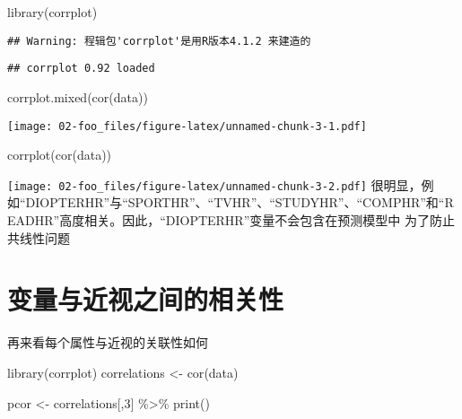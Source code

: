 \documentclass[]{ctexbook}
\newenvironment{Shaded}{\begin{snugshade}}{\end{snugshade}}
\newcommand{\DecValTok}[1]{\textcolor[rgb]{0.00,0.00,0.81}{#1}}
\newcommand{\FunctionTok}[1]{\textcolor[rgb]{0.00,0.00,0.00}{#1}}
\newcommand{\NormalTok}[1]{#1}
\newcommand{\OtherTok}[1]{\textcolor[rgb]{0.56,0.35,0.01}{#1}}
\newcommand{\SpecialCharTok}[1]{\textcolor[rgb]{0.00,0.00,0.00}{#1}}
\begin{document}
\begin{Shaded}
\begin{Highlighting}[]
\FunctionTok{library}\NormalTok{(corrplot)}
\end{Highlighting}
\end{Shaded}

\begin{verbatim}
## Warning: 程辑包'corrplot'是用R版本4.1.2 来建造的
\end{verbatim}

\begin{verbatim}
## corrplot 0.92 loaded
\end{verbatim}

\begin{Shaded}
\begin{Highlighting}[]
\FunctionTok{corrplot.mixed}\NormalTok{(}\FunctionTok{cor}\NormalTok{(data))}
\end{Highlighting}
\end{Shaded}

\texttt{[image: 02-foo\_files/figure-latex/unnamed-chunk-3-1.pdf]}

\begin{Shaded}
\begin{Highlighting}[]
\FunctionTok{corrplot}\NormalTok{(}\FunctionTok{cor}\NormalTok{(data))}
\end{Highlighting}
\end{Shaded}

\texttt{[image: 02-foo\_files/figure-latex/unnamed-chunk-3-2.pdf]}
很明显，例如``DIOPTERHR''与``SPORTHR''、``TVHR''、``STUDYHR''、``COMPHR''和``READHR''高度相关。因此，``DIOPTERHR''变量不会包含在预测模型中 为了防止共线性问题

\hypertarget{ux53d8ux91cfux4e0eux8fd1ux89c6ux4e4bux95f4ux7684ux76f8ux5173ux6027}{%
\section{变量与近视之间的相关性}\label{ux53d8ux91cfux4e0eux8fd1ux89c6ux4e4bux95f4ux7684ux76f8ux5173ux6027}}

再来看每个属性与近视的关联性如何

\begin{Shaded}
\begin{Highlighting}[]
\FunctionTok{library}\NormalTok{(corrplot)}
\NormalTok{correlations }\OtherTok{\textless{}{-}} \FunctionTok{cor}\NormalTok{(data) }

\NormalTok{pcor }\OtherTok{\textless{}{-}}\NormalTok{ correlations[,}\DecValTok{3}\NormalTok{] }\SpecialCharTok{\%\textgreater{}\%} 
  \FunctionTok{print}\NormalTok{()}
\end{Highlighting}
\end{Shaded}
\end{document}
